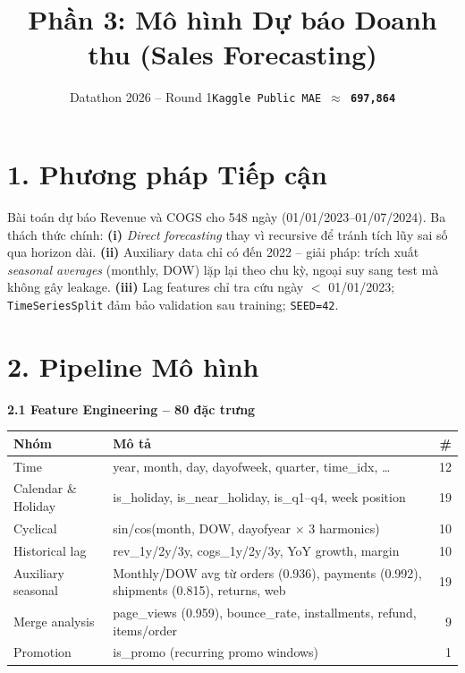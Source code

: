 \documentclass{article}
\title{Phần 3: Mô hình Dự báo Doanh thu (Sales Forecasting)}
\author{Datathon 2026 -- Round 1\quad\texttt{Kaggle Public MAE $\approx$ \textbf{697,864}}}
\begin{document}
\maketitle
\vspace{-1.5em}

\section*{1.\; Phương pháp Tiếp cận}

Bài toán dự báo Revenue và COGS cho 548 ngày (01/01/2023--01/07/2024). Ba thách thức chính:
\textbf{(i)} \textit{Direct forecasting} thay vì recursive để tránh tích lũy sai số qua horizon dài.
\textbf{(ii)} Auxiliary data chỉ có đến 2022 -- giải pháp: trích xuất \textit{seasonal averages} (monthly, DOW) lặp lại theo chu kỳ, ngoại suy sang test mà không gây leakage.
\textbf{(iii)} Lag features chỉ tra cứu ngày $<$ 01/01/2023; \texttt{TimeSeriesSplit} đảm bảo validation sau training; \texttt{SEED=42}.

\section*{2.\; Pipeline Mô hình}

\vspace{0.3em}
\noindent\textbf{2.1\; Feature Engineering -- 80 đặc trưng}

\begin{table}[H]
\vspace{-0.3em}
\centering\small
\setlength{\tabcolsep}{5pt}
\begin{tabular}{llr}
\toprule
\textbf{Nhóm} & \textbf{Mô tả} & \textbf{\#} \\
\midrule
Time           & year, month, day, dayofweek, quarter, time\_idx, \ldots & 12 \\
Calendar \& Holiday & is\_holiday, is\_near\_holiday, is\_q1--q4, week position & 19 \\
Cyclical       & sin/cos(month, DOW, dayofyear $\times$ 3 harmonics) & 10 \\
Historical lag & rev\_1y/2y/3y, cogs\_1y/2y/3y, YoY growth, margin & 10 \\
Auxiliary seasonal & Monthly/DOW avg từ orders (0.936), payments (0.992), shipments (0.815), returns, web & 19 \\
Merge analysis & page\_views (0.959), bounce\_rate, installments, refund, items/order & 9 \\
Promotion      & is\_promo (recurring promo windows) & 1 \\
\bottomrule
\end{tabular}
\vspace{-0.3em}
\end{table}
\end{document}
